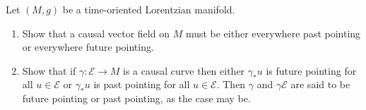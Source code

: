 Let $(M, g)$ be a time-oriented Lorentzian manifold.
\begin{enumerate}
\item[(a)] Show that a causal vector field on $M$ must be either everywhere past pointing or everywhere future pointing.
\item[(b)] Show that if $\gamma: \mathcal{E} \rightarrow M$ is a causal curve then either $\gamma_*u$ is future pointing for all $u \in \mathcal{E}$ or $\gamma_*u$ is past pointing for all $u \in \mathcal{E}$. Then $\gamma$ and $\gamma\mathcal{E}$ are said to be future pointing or past pointing, as the case may be.
\end{enumerate}
